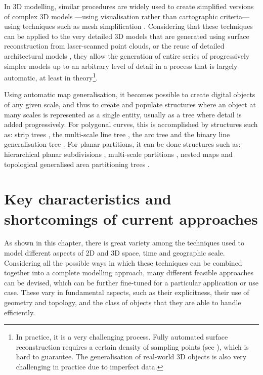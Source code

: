 In 3D modelling, similar procedures are widely used to create simplified versions of complex 3D models \citep{Meng07,Kada07,Zhu09,Zhao12}---using visualisation rather than cartographic criteria---using techniques such as mesh simplification \citep{Garland97,Lindstrom98}.
Considering that these techniques can be applied to the very detailed 3D models that are generated using surface reconstruction \citep{Amenta98,Kazhdan06} from laser-scanned point clouds, or the reuse of detailed architectural models \citep{Geiger15}, they allow the generation of entire series of progressively simpler models up to an arbitrary level of detail in a process that is largely automatic, at least in theory\footnote{In practice, it is a very challenging process. Fully automated surface reconstruction requires a certain density of sampling points (see \citet[Ch.~13]{Cheng12}), which is hard to guarantee.
The generalisation of real-world 3D objects is also very challenging in practice due to imperfect data.}.

Using automatic map generalisation, it becomes possible to create digital objects of any given scale, and thus to create and populate structures where an object at many scales is represented as a single entity, usually as a tree where detail is added progressively.
For polygonal curves, this is accomplished by structures such as: strip trees \citep{Ballard81}, the multi-scale line tree \citep{Jones86}, the arc tree \citep{Gunther88} and the binary line generalisation tree \citep{vanOosterom90}.
For planar partitions, it can be done structures such as: hierarchical planar subdivisions \citep{Filho95}, multi-scale partitions \citep{Rigaux95}, nested maps \citep{Plumer97} and topological generalised area partitioning trees \citep{vanOosterom05}.

\section{Key characteristics and shortcomings of current approaches}
\label{se:modelling-conclusions}

As shown in this chapter, there is great variety among the techniques used to model different aspects of 2D and 3D space, time and geographic scale.
Considering all the possible ways in which these techniques can be combined together into a complete modelling approach, many different feasible approaches can be devised, which can be further fine-tuned for a particular application or use case.
These vary in fundamental aspects, such as their explicitness, their use of geometry and topology, and the class of objects that they are able to handle efficiently.

